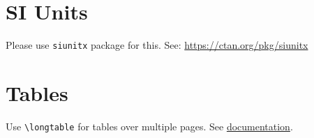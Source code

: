 \section{SI Units}
Please use \texttt{siunitx} package for this. See:  \url{https://ctan.org/pkg/siunitx}

\section{Tables}
\begin{table}[H]
\caption{Tables have caption on top.}
\label{tab:table_caption}
\centering
{}
\end{table}

Use \texttt{\textbackslash longtable} for tables over multiple pages. See \href{https://de.wikibooks.org/wiki/LaTeX-W%C3%B6rterbuch:_longtable_(Umgebung)}{documentation}.

